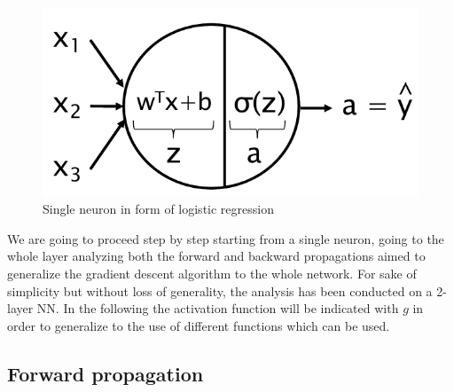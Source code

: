 \begin{figure}[h]
    \centering
    \includegraphics[scale=0.4]{img/single_log_neuron.png}
    \caption{Single neuron in form of logistic regression}
\end{figure}
\noindent
We are going to proceed step by step starting from a single neuron, going to the whole layer analyzing both the forward and backward propagations aimed to generalize the gradient descent algorithm to the whole network. For sake of simplicity but without loss of generality, the analysis has been conducted on a 2-layer NN. In the following the activation function will be indicated with $g$  in order to generalize to the use of different functions which can be used.

\subsection{Forward propagation}

